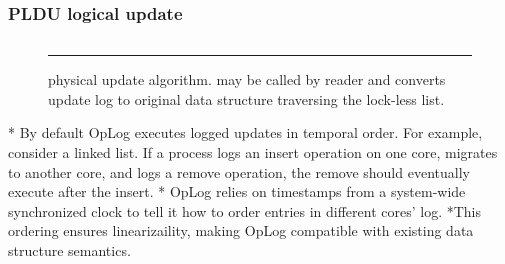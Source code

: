 \subsubsection{PLDU logical update}








\begin{figure}[tb!]

\inputminted[linenos,fontsize=\footnotesize, tabsize=2]{c}{src/pldu_physical.c}

\rule{\columnwidth}{0.5pt}
\vspace{-\baselineskip}
\caption{ physical update algorithm.  may be
 called by reader and converts update log to original data structure
 traversing the lock-less list.}
\label{fig:plduphysicalupdate}
\end{figure}






* By default OpLog executes logged updates in temporal order. For example,
consider a linked list. If a process logs an insert operation on one core,
migrates to another core, and logs a remove operation, the remove should
eventually execute after the insert.
* OpLog relies on timestamps from a system-wide synchronized clock to tell it
how to order entries in different cores' log.
*This ordering ensures linearizaility, making OpLog compatible with existing
data structure semantics.





